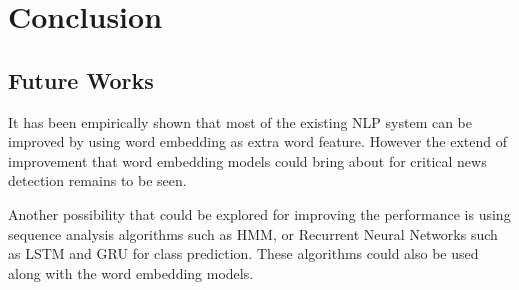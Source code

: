 \chapter{Conclusion}\label{conclusion}

\section{Future Works}
It has been empirically shown that most of the existing NLP system can be improved by using word embedding as extra word feature\cite{turian2010word}. However the extend of improvement that word embedding models could bring about for critical news detection remains to be   seen.\par
Another possibility that could be explored for improving the performance is using sequence analysis algorithms such as HMM\cite{baum1966statistical}, or Recurrent Neural Networks such as LSTM\cite{hochreiter1997long} and GRU\cite{cho2014learning} for class prediction. These algorithms could also be used along with the word embedding models.   